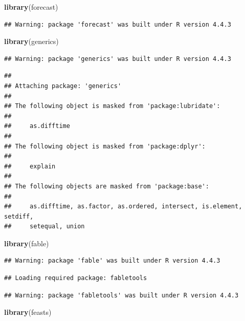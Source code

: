 \documentclass[
]{article}
\newenvironment{Shaded}{\begin{snugshade}}{\end{snugshade}}
\newcommand{\FunctionTok}[1]{\textcolor[rgb]{0.13,0.29,0.53}{\textbf{#1}}}
\newcommand{\NormalTok}[1]{#1}
\begin{document}
\begin{Shaded}
\begin{Highlighting}[]
\FunctionTok{library}\NormalTok{(forecast)}
\end{Highlighting}
\end{Shaded}

\begin{verbatim}
## Warning: package 'forecast' was built under R version 4.4.3
\end{verbatim}

\begin{Shaded}
\begin{Highlighting}[]
\FunctionTok{library}\NormalTok{(generics)}
\end{Highlighting}
\end{Shaded}

\begin{verbatim}
## Warning: package 'generics' was built under R version 4.4.3
\end{verbatim}

\begin{verbatim}
## 
## Attaching package: 'generics'
## 
## The following object is masked from 'package:lubridate':
## 
##     as.difftime
## 
## The following object is masked from 'package:dplyr':
## 
##     explain
## 
## The following objects are masked from 'package:base':
## 
##     as.difftime, as.factor, as.ordered, intersect, is.element, setdiff,
##     setequal, union
\end{verbatim}

\begin{Shaded}
\begin{Highlighting}[]
\FunctionTok{library}\NormalTok{(fable)}
\end{Highlighting}
\end{Shaded}

\begin{verbatim}
## Warning: package 'fable' was built under R version 4.4.3
\end{verbatim}

\begin{verbatim}
## Loading required package: fabletools
\end{verbatim}

\begin{verbatim}
## Warning: package 'fabletools' was built under R version 4.4.3
\end{verbatim}

\begin{Shaded}
\begin{Highlighting}[]
\FunctionTok{library}\NormalTok{(feasts)}
\end{Highlighting}
\end{Shaded}
\end{document}
